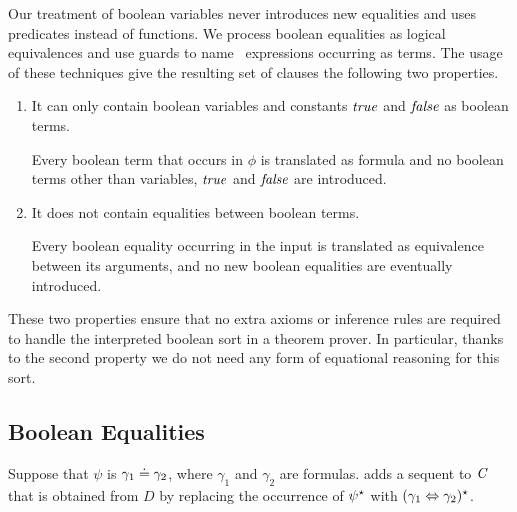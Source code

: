 Our treatment of boolean variables never introduces new equalities and uses \skolem{} predicates instead of \skolem{} functions.
We process boolean equalities as logical equivalences and use guards to name \ITE\ expressions occurring as terms. The usage of these techniques give the resulting set of clauses the following two properties.
\begin{enumerate}
  \item It can only contain boolean variables and constants $\mathit{true}$ and $\mathit{false}$ as boolean terms. 
  
  Every boolean term that occurs in $\phi$ is translated as formula and no boolean terms other than variables, $\mathit{true}$ and $\mathit{false}$ are introduced. 
  \item It does not contain equalities between boolean terms. \label{item_no_eq} 
  
  Every boolean equality occurring in the input is translated as equivalence between its arguments, and no new boolean equalities are eventually introduced.
\end{enumerate}
These two properties ensure that 
no extra axioms or inference rules are required to handle the interpreted boolean sort in a theorem prover.
In particular, thanks to the second property we do not need any form of equational reasoning for this sort.


\subsection*{Boolean Equalities}
Suppose that $\psi$ is $\gamma_1 \doteq \gamma_2$, where $\gamma_1$ and $\gamma_2$ are formulas.
\nfcnf{} adds a sequent to $\mathit{C}$ that is obtained from $D$ by replacing the occurrence of ${\psi}^{\star}$ 
with $(\gamma_1 \Leftrightarrow \gamma_2)^{\star}$.

